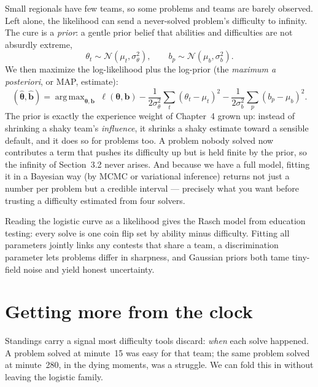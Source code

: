 \documentclass[11pt]{report}
\DeclareMathOperator*{\argmax}{arg\,max}
\theoremstyle{definition}
\numberwithin{equation}{chapter}
\begin{document}
Small regionals have few teams, so some problems and teams are barely observed.
Left alone, the likelihood can send a never-solved problem's difficulty to
infinity. The cure is a \emph{prior}: a gentle prior belief that abilities and
difficulties are not absurdly extreme,
\begin{equation}\label{eq:priors}
  \theta_t\sim\mathcal N(\mu_t,\sigma_\theta^2),\qquad
  b_p\sim\mathcal N(\mu_b,\sigma_b^2).
\end{equation}
We then maximize the log-likelihood plus the log-prior (the \emph{maximum a
posteriori}, or MAP, estimate):
\begin{equation}\label{eq:map}
  (\hat{\bm\theta},\hat{\bm b})=\argmax_{\bm\theta,\bm b}\;
  \ell(\bm\theta,\bm b)
  -\frac{1}{2\sigma_\theta^2}\sum_t(\theta_t-\mu_t)^2
  -\frac{1}{2\sigma_b^2}\sum_p(b_p-\mu_b)^2 .
\end{equation}
The prior is exactly the experience weight of Chapter~4 grown up: instead of
shrinking a shaky team's \emph{influence}, it shrinks a shaky estimate toward a
sensible default, and it does so for problems too. A problem nobody solved now
contributes a term that pushes its difficulty up but is held finite by the prior,
so the infinity of Section~3.2 never arises. And because we have a full model,
fitting it in a Bayesian way (by MCMC or variational inference) returns not just a
number per problem but a credible interval --- precisely what you want before
trusting a difficulty estimated from four solvers.

\begin{takeaway}
Reading the logistic curve as a likelihood gives the Rasch model from education
testing: every solve is one coin flip set by ability minus difficulty. Fitting all
parameters jointly links any contests that share a team, a discrimination
parameter lets problems differ in sharpness, and Gaussian priors both tame
tiny-field noise and yield honest uncertainty.
\end{takeaway}

\chapter{Getting more from the clock}

Standings carry a signal most difficulty tools discard: \emph{when} each solve
happened. A problem solved at minute~15 was easy for that team; the same problem
solved at minute~280, in the dying moments, was a struggle. We can fold this in
without leaving the logistic family.
\end{document}
